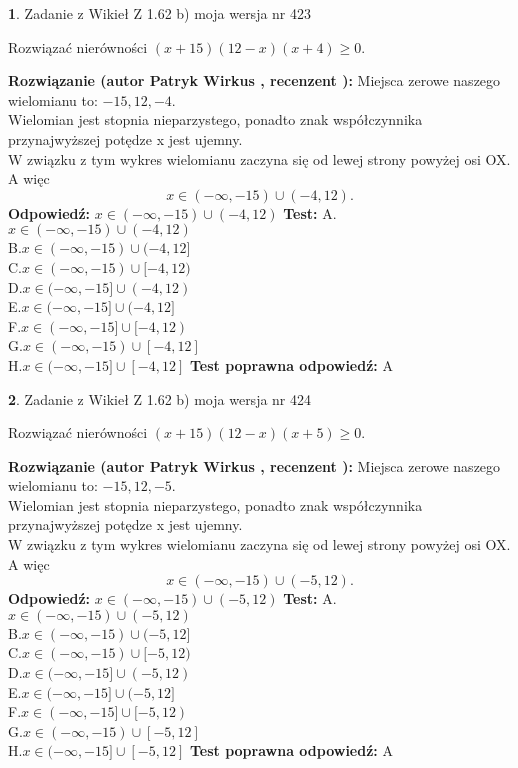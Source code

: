 \documentclass[12pt, a4paper]{article}
\theoremstyle{definition} %
\newtheorem{zad}{}
\newcommand{\zadStart}[1]{\begin{zad}#1\newline}
\newcommand{\zadStop}{\end{zad}}
\newcommand{\rozwStart}[2]{\noindent \textbf{Rozwiązanie (autor #1 , recenzent #2): }\newline}
\newcommand{\rozwStop}{\newline}
\newcommand{\odpStart}{\noindent \textbf{Odpowiedź:}\newline}
\newcommand{\odpStop}{\newline}
\newcommand{\testStart}{\noindent \textbf{Test:}\newline}
\newcommand{\testStop}{\newline}
\newcommand{\kluczStart}{\noindent \textbf{Test poprawna odpowiedź:}\newline}
\newcommand{\kluczStop}{\newline}
\begin{document}
\zadStart{Zadanie z Wikieł Z 1.62 b) moja wersja nr 423}

Rozwiązać nierówności $(x+15)(12-x)(x+4)\ge0$.
\zadStop
\rozwStart{Patryk Wirkus}{}
Miejsca zerowe naszego wielomianu to: $-15, 12, -4$.\\
Wielomian jest stopnia nieparzystego, ponadto znak współczynnika przy\linebreak najwyższej potędze x jest ujemny.\\ W związku z tym wykres wielomianu zaczyna się od lewej strony powyżej osi OX. A więc $$x \in (-\infty,-15) \cup (-4,12).$$
\rozwStop
\odpStart
$x \in (-\infty,-15) \cup (-4,12)$
\odpStop
\testStart
A.$x \in (-\infty,-15) \cup (-4,12)$\\
B.$x \in (-\infty,-15) \cup (-4,12]$\\
C.$x \in (-\infty,-15) \cup [-4,12)$\\
D.$x \in (-\infty,-15] \cup (-4,12)$\\
E.$x \in (-\infty,-15] \cup (-4,12]$\\
F.$x \in (-\infty,-15] \cup [-4,12)$\\
G.$x \in (-\infty,-15) \cup [-4,12]$\\
H.$x \in (-\infty,-15] \cup [-4,12]$
\testStop
\kluczStart
A
\kluczStop



\zadStart{Zadanie z Wikieł Z 1.62 b) moja wersja nr 424}

Rozwiązać nierówności $(x+15)(12-x)(x+5)\ge0$.
\zadStop
\rozwStart{Patryk Wirkus}{}
Miejsca zerowe naszego wielomianu to: $-15, 12, -5$.\\
Wielomian jest stopnia nieparzystego, ponadto znak współczynnika przy\linebreak najwyższej potędze x jest ujemny.\\ W związku z tym wykres wielomianu zaczyna się od lewej strony powyżej osi OX. A więc $$x \in (-\infty,-15) \cup (-5,12).$$
\rozwStop
\odpStart
$x \in (-\infty,-15) \cup (-5,12)$
\odpStop
\testStart
A.$x \in (-\infty,-15) \cup (-5,12)$\\
B.$x \in (-\infty,-15) \cup (-5,12]$\\
C.$x \in (-\infty,-15) \cup [-5,12)$\\
D.$x \in (-\infty,-15] \cup (-5,12)$\\
E.$x \in (-\infty,-15] \cup (-5,12]$\\
F.$x \in (-\infty,-15] \cup [-5,12)$\\
G.$x \in (-\infty,-15) \cup [-5,12]$\\
H.$x \in (-\infty,-15] \cup [-5,12]$
\testStop
\kluczStart
A
\kluczStop
\end{document}
